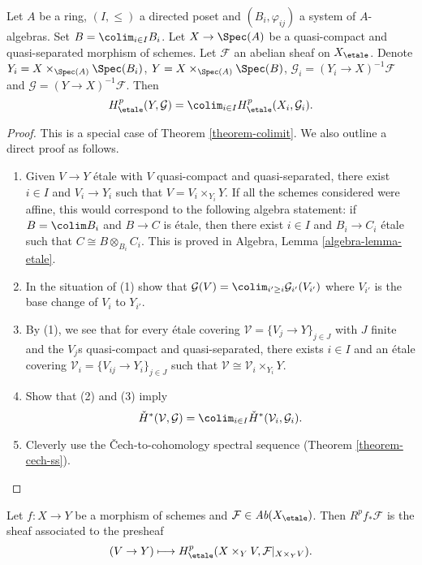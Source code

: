 \begin{lemma}
\label{lemma-directed-colimit-cohomology}
Let $A$ be a ring, $(I, \leq)$ a directed poset and $(B_i, \varphi_{ij})$ a
system of $A$-algebras. Set $B = \colim_{i\in I} B_i$. Let $X \to \Spec(A)$
be a quasi-compact and quasi-separated morphism of schemes. Let
$\mathcal{F}$ an abelian sheaf on $X_\etale$.
Denote $Y_i = X \times_{\Spec(A)} \Spec(B_i)$,
$Y = X \times_{\Spec(A)} \Spec(B)$,
$\mathcal{G}_i = (Y_i \to X)^{-1}\mathcal{F}$ and
$\mathcal{G} = (Y \to X)^{-1}\mathcal{F}$. Then
$$
H_\etale^p(Y, \mathcal{G}) =
\colim_{i\in I} H_\etale^p (X_i, \mathcal{G}_i).
$$
\end{lemma}

\begin{proof}
This is a special case of Theorem \ref{theorem-colimit}.
We also outline a direct proof as follows.
\begin{enumerate}
\item Given $V \to Y$ \'etale with $V$ quasi-compact and
quasi-separated, there exist $i\in I$ and $V_i \to Y_i$ such that
$V = V_i \times_{Y_i} Y$.
If all the schemes considered were affine, this would correspond to the
following algebra statement: if $B = \colim B_i$ and $B \to C$ is \'etale,
then there exist $i \in I$ and $B_i \to C_i$ \'etale such that
$C \cong B \otimes_{B_i} C_i$.
This is proved in Algebra, Lemma \ref{algebra-lemma-etale}.
\item In the situation of (1) show that
$\mathcal{G}(V) = \colim_{i' \geq i} \mathcal{G}_{i'}(V_{i'})$
where $V_{i'}$ is the base change of $V_i$ to $Y_{i'}$.
\item By (1), we see that for every \'etale covering
$\mathcal{V} = \{V_j \to Y\}_{j\in J}$ with $J$ finite and the
$V_j$s quasi-compact and quasi-separated, there exists $i \in I$ and
an \'etale covering $\mathcal{V}_i = \{V_{ij} \to Y_i\}_{j \in J}$
such that $\mathcal{V} \cong \mathcal{V}_i \times_{Y_i} Y$.
\item Show that (2) and (3) imply
$$
\check H^*(\mathcal{V}, \mathcal{G})=
\colim_{i\in I} \check H^*(\mathcal{V}_i, \mathcal{G}_i).
$$
\item Cleverly use the {\v C}ech-to-cohomology spectral sequence
(Theorem \ref{theorem-cech-ss}).
\end{enumerate}
\end{proof}

\begin{lemma}
\label{lemma-higher-direct-images}
Let $f: X\to Y$ be a morphism of schemes and $\mathcal{F}\in
\textit{Ab}(X_\etale)$. Then $R^pf_*\mathcal{F}$ is the sheaf
associated to the presheaf
$$
(V \to Y) \longmapsto H_\etale^p(X \times_Y V, \mathcal{F}|_{X \times_Y V}).
$$
\end{lemma}

